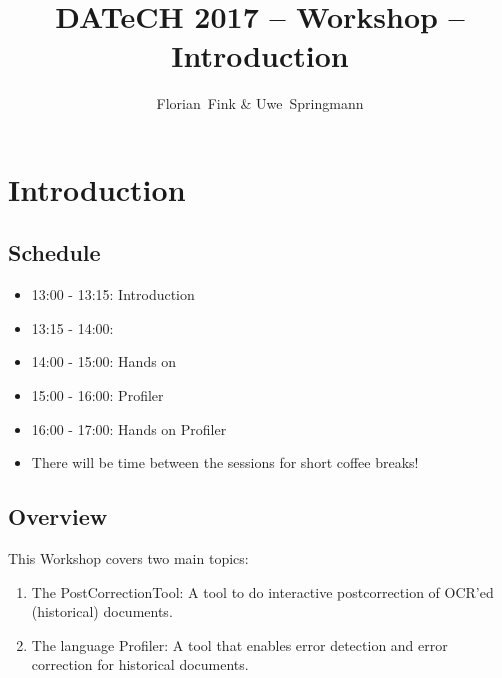 
\title{DATeCH 2017 -- \pocoto{} Workshop -- Introduction}
\author{Florian~Fink \& Uwe~Springmann}



\begin{frame}
	\titlepage
\end{frame}

\section{Introduction}
\subsection{Schedule}
\begin{frame}
	\begin{itemize}
		\item 13:00 - 13:15: Introduction
		\item 13:15 - 14:00: \pocoto{}
		\item 14:00 - 15:00: Hands on \pocoto{}
		\item 15:00 - 16:00: Profiler
		\item 16:00 - 17:00: Hands on Profiler
		\item There will be time between the sessions for short coffee breaks!
	\end{itemize}
\end{frame}

\subsection{Overview}
\begin{frame}
	This Workshop covers two main topics:
	\begin{enumerate}
		\item The \pocoto{} PostCorrectionTool: A tool to do interactive
			postcorrection of OCR'ed (historical) documents.
		\item The language Profiler: A tool that enables error detection and error
			correction for historical documents.
	\end{enumerate}
\end{frame}


